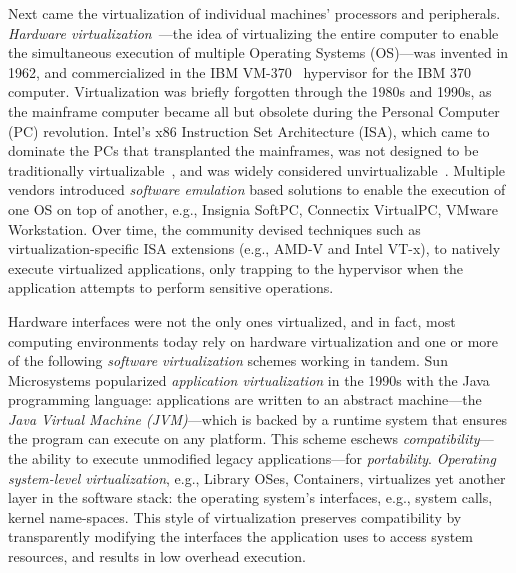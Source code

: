 Next came the virtualization of individual machines' processors and peripherals.
\emph{Hardware virtualization}~\cite{cp40}---the idea of virtualizing the
entire computer to enable the simultaneous execution of multiple Operating
Systems (OS)---was invented in 1962, and commercialized in the IBM
VM-370~\cite{vm370} hypervisor for the IBM 370 computer.
Virtualization was briefly forgotten through the 1980s and 1990s, as the
mainframe computer became all but obsolete during the Personal Computer (PC)
revolution. Intel's x86 Instruction Set Architecture (ISA), which came to
dominate the PCs that transplanted the mainframes, was not designed to be
traditionally virtualizable~\cite{popek-goldberg}, and was widely considered
unvirtualizable~\cite{gelsinger-pc,bugnion-workstation}. Multiple vendors
introduced \emph{software emulation} based solutions to enable the execution
of one OS on top of another, e.g., Insignia SoftPC, Connectix VirtualPC,
VMware Workstation. Over time, the community devised techniques such as
virtualization-specific ISA extensions (e.g., AMD-V and Intel VT-x), to
natively execute virtualized applications, only trapping to the hypervisor
when the application attempts to perform sensitive operations.

Hardware interfaces were not the only ones virtualized, and in fact, most
computing environments today rely on hardware virtualization and one or more
of the following \emph{software virtualization} schemes working in tandem.
Sun Microsystems popularized \emph{application virtualization} in the 1990s
with the Java programming language: applications are written to an abstract
machine---the \emph{Java Virtual Machine (JVM)}---which is backed by a runtime
system that ensures the program can execute on any platform.
This scheme eschews \emph{compatibility}---the ability to execute unmodified
legacy applications---for \emph{portability}.
\emph{Operating system-level virtualization}, e.g., Library OSes, Containers,
virtualizes yet another layer in the software stack: the operating system's
interfaces, e.g., system calls, kernel name-spaces. This style of
virtualization preserves compatibility by transparently modifying the
interfaces the application uses to access system resources, and results in
low overhead execution.


